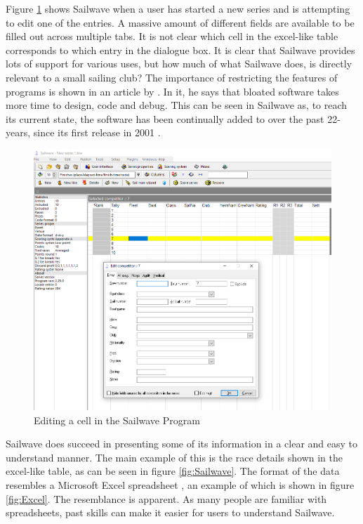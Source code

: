 \documentclass{l4proj}
\begin{document}
Figure \ref{fig:SailwaveEdit} shows Sailwave when a user has started a new series and is attempting to edit one of the entries. A massive amount of different fields are available to be filled out across multiple tabs. It is not clear which cell in the excel-like table corresponds to which entry in the dialogue box. It is clear that Sailwave provides lots of support for various uses, but how much of what Sailwave does, is directly relevant to a small sailing club? The importance of restricting the features of programs is shown in an article by \citet{leanSoftware}. In it, he says that bloated software takes more time to design, code and debug. This can be seen in Sailwave as, to reach its current state, the software has been continually added to over the past 22-years, since its first release in 2001 \citep{sailwave}.

\begin{figure}[H]
    \centering
    \includegraphics[width=1\linewidth]{images/Sailwave_edit.png} 

    \caption{Editing a cell in the Sailwave Program \citep{sailwave}
    }

    \label{fig:SailwaveEdit} 
\end{figure}

Sailwave does succeed in presenting some of its information in a clear and easy to understand manner. The main example of this is the race details shown in the excel-like table, as can be seen in figure \ref{fig:Sailwave}. The format of the data resembles a Microsoft Excel spreadsheet \citep{Excel}, an example of which is shown in figure \ref{fig:Excel}. The resemblance is apparent. As many people are familiar with spreadsheets, past skills can make it easier for users to understand Sailwave.
\end{document}
